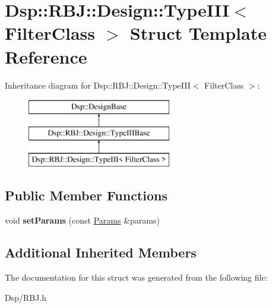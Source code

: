 \hypertarget{structDsp_1_1RBJ_1_1Design_1_1TypeIII}{\section{Dsp\-:\-:R\-B\-J\-:\-:Design\-:\-:Type\-I\-I\-I$<$ Filter\-Class $>$ Struct Template Reference}
\label{structDsp_1_1RBJ_1_1Design_1_1TypeIII}
}
Inheritance diagram for Dsp\-:\-:R\-B\-J\-:\-:Design\-:\-:Type\-I\-I\-I$<$ Filter\-Class $>$\-:\begin{figure}[H]
\begin{center}
\leavevmode
\includegraphics[height=3.000000cm]{structDsp_1_1RBJ_1_1Design_1_1TypeIII}
\end{center}
\end{figure}
\subsection*{Public Member Functions}
\begin{DoxyCompactItemize}
\item 
\hypertarget{structDsp_1_1RBJ_1_1Design_1_1TypeIII_a0fef557806867af09b17b01f432d079e}{void {\bfseries set\-Params} (const \hyperlink{structDsp_1_1Params}{Params} \&params)}\label{structDsp_1_1RBJ_1_1Design_1_1TypeIII_a0fef557806867af09b17b01f432d079e}

\end{DoxyCompactItemize}
\subsection*{Additional Inherited Members}


The documentation for this struct was generated from the following file\-:\begin{DoxyCompactItemize}
\item 
Dsp/R\-B\-J.\-h\end{DoxyCompactItemize}
